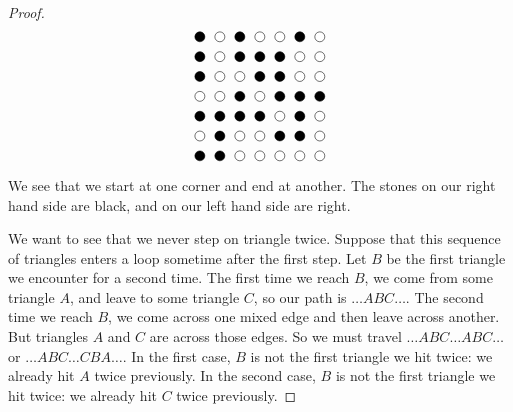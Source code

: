 \begin{proof}
\[\begin{tikzpicture}[scale=.5]
{}
\draw[black,fill=black] (0,0) circle (.25cm);
\draw[black,fill=white] (0,1) circle (.25cm);
\draw[black,fill=black] (0,2) circle (.25cm);
\draw[black,fill=white] (0,3) circle (.25cm);
\draw[black,fill=black] (0,4) circle (.25cm);
\draw[black,fill=black] (0,5) circle (.25cm);
\draw[black,fill=black] (0,6) circle (.25cm);
\draw[black,fill=black] (1,0) circle (.25cm);
\draw[black,fill=black] (1,1) circle (.25cm);
\draw[black,fill=black] (1,2) circle (.25cm);
\draw[black,fill=white] (1,3) circle (.25cm);
\draw[black,fill=white] (1,4) circle (.25cm);
\draw[black,fill=white] (1,5) circle (.25cm);
\draw[black,fill=white] (1,6) circle (.25cm);
\draw[black,fill=white] (2,0) circle (.25cm);
\draw[black,fill=white] (2,1) circle (.25cm);
\draw[black,fill=black] (2,2) circle (.25cm);
\draw[black,fill=black] (2,3) circle (.25cm);
\draw[black,fill=white] (2,4) circle (.25cm);
\draw[black,fill=black] (2,5) circle (.25cm);
\draw[black,fill=black] (2,6) circle (.25cm);
\draw[black,fill=white] (3,0) circle (.25cm);
\draw[black,fill=white] (3,1) circle (.25cm);
\draw[black,fill=black] (3,2) circle (.25cm);
\draw[black,fill=white] (3,3) circle (.25cm);
\draw[black,fill=black] (3,4) circle (.25cm);
\draw[black,fill=black] (3,5) circle (.25cm);
\draw[black,fill=white] (3,6) circle (.25cm);
\draw[black,fill=white] (4,0) circle (.25cm);
\draw[black,fill=black] (4,1) circle (.25cm);
\draw[black,fill=white] (4,2) circle (.25cm);
\draw[black,fill=black] (4,3) circle (.25cm);
\draw[black,fill=black] (4,4) circle (.25cm);
\draw[black,fill=black] (4,5) circle (.25cm);
\draw[black,fill=white] (4,6) circle (.25cm);
\draw[black,fill=white] (5,0) circle (.25cm);
\draw[black,fill=black] (5,1) circle (.25cm);
\draw[black,fill=black] (5,2) circle (.25cm);
\draw[black,fill=black] (5,3) circle (.25cm);
\draw[black,fill=white] (5,4) circle (.25cm);
\draw[black,fill=white] (5,5) circle (.25cm);
\draw[black,fill=black] (5,6) circle (.25cm);
\draw[black,fill=white] (6,0) circle (.25cm);
\draw[black,fill=white] (6,1) circle (.25cm);
\draw[black,fill=white] (6,2) circle (.25cm);
\draw[black,fill=black] (6,3) circle (.25cm);
\draw[black,fill=white] (6,4) circle (.25cm);
\draw[black,fill=white] (6,5) circle (.25cm);
\draw[black,fill=white] (6,6) circle (.25cm);
\end{tikzpicture}
\]
We see that we start at one corner and end at another.
The stones on our right hand side are black, and on our left hand side are right.

We want to see that we never step on triangle twice.
Suppose that this sequence of triangles enters a loop sometime after the first step.
Let \(B\) be the first triangle we encounter for a second time.
The first time we reach \(B\), we come from some triangle \(A\), and leave to some triangle \(C\), so our path is \(\dots ABC\dots\).
The second time we reach \(B\), we come across one mixed edge and then leave across another.
But triangles \(A\) and \(C\) are across those edges.
So we must travel \(\dots ABC\dots ABC\dots\) or \(\dots ABC\dots CBA\dots\).
In the first case, \(B\) is not the first triangle we hit twice: we already hit \(A\) twice previously.
In the second case, \(B\) is not the first triangle we hit twice: we already hit \(C\) twice previously.


\end{proof}
